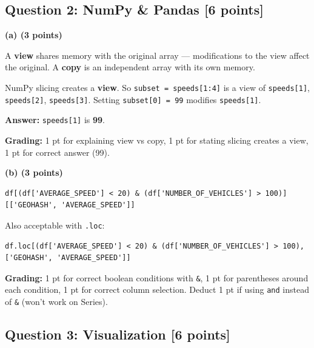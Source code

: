 \documentclass[11pt,a4paper]{article}
\begin{document}
\vspace{0.3cm}

\subsection*{Question 2: NumPy \& Pandas [6 points]}

\noindent\textbf{(a) (3 points)}

\begin{answerbox}
A \textbf{view} shares memory with the original array --- modifications to the view affect the original. A \textbf{copy} is an independent array with its own memory.

NumPy slicing creates a \textbf{view}. So \lstinline{subset = speeds[1:4]} is a view of \lstinline{speeds[1]}, \lstinline{speeds[2]}, \lstinline{speeds[3]}. Setting \lstinline{subset[0] = 99} modifies \lstinline{speeds[1]}.

\textbf{Answer:} \lstinline{speeds[1]} is \textbf{99}.

\textbf{Grading:} 1 pt for explaining view vs copy, 1 pt for stating slicing creates a view, 1 pt for correct answer (99).
\end{answerbox}

\vspace{0.3cm}

\noindent\textbf{(b) (3 points)}

\begin{answerbox}
\begin{lstlisting}[backgroundcolor=\color{white},frame=none]
df[(df['AVERAGE_SPEED'] < 20) & (df['NUMBER_OF_VEHICLES'] > 100)][['GEOHASH', 'AVERAGE_SPEED']]
\end{lstlisting}

Also acceptable with \lstinline{.loc}:
\begin{lstlisting}[backgroundcolor=\color{white},frame=none]
df.loc[(df['AVERAGE_SPEED'] < 20) & (df['NUMBER_OF_VEHICLES'] > 100), ['GEOHASH', 'AVERAGE_SPEED']]
\end{lstlisting}

\textbf{Grading:} 1 pt for correct boolean conditions with \lstinline{&}, 1 pt for parentheses around each condition, 1 pt for correct column selection. Deduct 1 pt if using \lstinline{and} instead of \lstinline{&} (won't work on Series).
\end{answerbox}

\newpage
\subsection*{Question 3: Visualization [6 points]}
\end{document}

